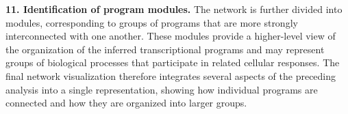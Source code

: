 \documentclass[11pt,a4paper]{article}
\begin{document}
\textbf{11. Identification of program modules.} The network is further divided into modules, corresponding to groups of programs that are more strongly interconnected with one another. These modules provide a higher-level view of the organization of the inferred transcriptional programs and may represent groups of biological processes that participate in related cellular responses. The final network visualization therefore integrates several aspects of the preceding analysis into a single representation, showing how individual programs are connected and how they are organized into larger groups. 

%
%
%
%
%
%
%
%
\end{document}
